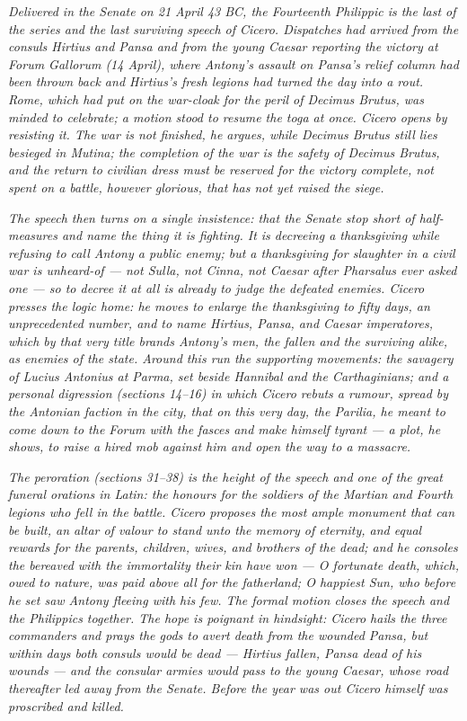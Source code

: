 
\textit{Delivered in the Senate on 21 April 43 BC, the Fourteenth
Philippic is the last of the series and the last surviving speech of
Cicero. Dispatches had arrived from the consuls Hirtius and Pansa and
from the young Caesar reporting the victory at Forum Gallorum (14
April), where Antony's assault on Pansa's relief column had been thrown
back and Hirtius's fresh legions had turned the day into a rout. Rome,
which had put on the war-cloak for the peril of Decimus Brutus, was
minded to celebrate; a motion stood to resume the toga at once. Cicero
opens by resisting it. The war is not finished, he argues, while
Decimus Brutus still lies besieged in Mutina; the completion of the
war is the safety of Decimus Brutus, and the return to civilian dress
must be reserved for the victory complete, not spent on a battle,
however glorious, that has not yet raised the siege.}

\textit{The speech then turns on a single insistence: that the Senate
stop short of half-measures and name the thing it is fighting. It is
decreeing a thanksgiving while refusing to call Antony a public enemy;
but a thanksgiving for slaughter in a civil war is unheard-of --- not
Sulla, not Cinna, not Caesar after Pharsalus ever asked one --- so to
decree it at all is already to judge the defeated enemies. Cicero
presses the logic home: he moves to enlarge the thanksgiving to fifty
days, an unprecedented number, and to name Hirtius, Pansa, and Caesar
\textit{imperatores}, which by that very title brands Antony's men, the
fallen and the surviving alike, as enemies of the state. Around this
run the supporting movements: the savagery of Lucius Antonius at Parma,
set beside Hannibal and the Carthaginians; and a personal digression
(sections 14--16) in which Cicero rebuts a rumour, spread by the
Antonian faction in the city, that on this very day, the Parilia, he
meant to come down to the Forum with the fasces and make himself
tyrant --- a plot, he shows, to raise a hired mob against him and open
the way to a massacre.}

\textit{The peroration (sections 31--38) is the height of the speech
and one of the great funeral orations in Latin: the honours for the
soldiers of the Martian and Fourth legions who fell in the battle.
Cicero proposes the most ample monument that can be built, an altar of
valour to stand unto the memory of eternity, and equal rewards for the
parents, children, wives, and brothers of the dead; and he consoles the
bereaved with the immortality their kin have won --- \textit{O fortunate
death, which, owed to nature, was paid above all for the fatherland};
\textit{O happiest Sun, who before he set saw Antony fleeing with his
few}. The formal motion closes the speech and the Philippics together.
The hope is poignant in hindsight: Cicero hails the three commanders
and prays the gods to avert death from the wounded Pansa, but within
days both consuls would be dead --- Hirtius fallen, Pansa dead of his
wounds --- and the consular armies would pass to the young Caesar,
whose road thereafter led away from the Senate. Before the year was
out Cicero himself was proscribed and killed.}
